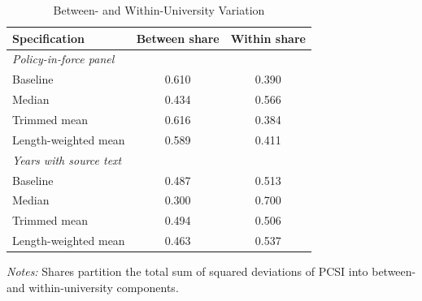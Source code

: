 \begin{table}[htbp]
\centering
\small
\caption{Between- and Within-University Variation}
\label{tab:variance}
\begin{threeparttable}
\begin{tabular}{lcc}
\toprule
Specification & Between share & Within share \\
\midrule
\multicolumn{3}{l}{\textit{Policy-in-force panel}} \\
\quad Baseline & 0.610 & 0.390 \\
\quad Median & 0.434 & 0.566 \\
\quad Trimmed mean & 0.616 & 0.384 \\
\quad Length-weighted mean & 0.589 & 0.411 \\
\multicolumn{3}{l}{\textit{Years with source text}} \\
\quad Baseline & 0.487 & 0.513 \\
\quad Median & 0.300 & 0.700 \\
\quad Trimmed mean & 0.494 & 0.506 \\
\quad Length-weighted mean & 0.463 & 0.537 \\
\bottomrule
\end{tabular}
\begin{tablenotes}[flushleft]\footnotesize
\item \textit{Notes:} Shares partition the total sum of squared deviations of PCSI into between- and within-university components.
\end{tablenotes}
\end{threeparttable}
\end{table}
